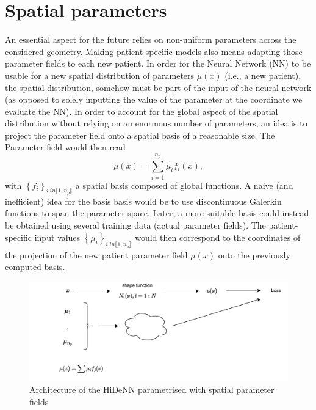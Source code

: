\documentclass{article}
\begin{document}
\section{Spatial parameters}
An essential aspect for the future relies on non-uniform parameters across the considered geometry. Making patient-specific models also means adapting those parameter fields to each new patient. In order for the Neural Network (NN) to be usable for a new spatial distribution of parameters $\mu\left(x\right)$ (i.e., a new patient), the spatial distribution, somehow must be part of the input of the neural network (as opposed to solely inputting the value of the parameter at the coordinate we evaluate the NN).
In order to account for the global aspect of the spatial distribution without relying on an enormous number of parameters, an idea is to project the parameter field onto a spatial basis of a reasonable size. The Parameter field would then read 
\begin{equation}
    \mu\left(x\right) = \sum_{i=1}^{n_p}\mu_i f_i\left(x\right), 
    \label{eq:Projection_parameterField}
\end{equation}
with $\left\{f_i\right\}_{i \ in \llbracket 1,n_p \rrbracket}$ a spatial basis composed of global functions. A naive (and inefficient) idea for the basis basis would be to use discontinuous Galerkin functions to span the parameter space. Later, a more suitable basis could instead be obtained using several training data (actual parameter fields). The patient-specific input values $\left\{\mu_i\right\}_{i \ in \llbracket 1,n_p \rrbracket}$ would then correspond to the coordinates of the projection of the new patient parameter field $\mu(x)$ onto the previously computed basis.


\begin{figure}[h]
    \centering
    \includegraphics[width = 0.8\linewidth]{Figures/Diagram_1.pdf}
    \caption{Architecture of the HiDeNN parametrised with spatial parameter fields}
    \label{SpatialVariability}
\end{figure}
\end{document}
